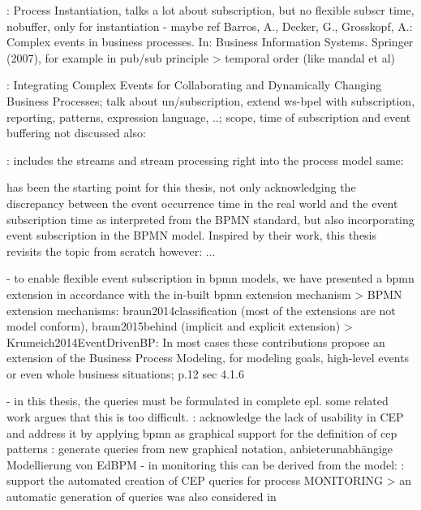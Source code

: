 \cite{decker2008instantiation}: Process Instantiation, talks a lot about subscription, but no flexible subscr time, nobuffer, only for instantiation
- maybe ref Barros, A., Decker, G., Grosskopf, A.: Complex events in business processes. In: Business Information Systems. Springer (2007), for example in pub/sub principle > temporal order (like mandal et al)


\cite{von2010integrating}: Integrating Complex Events for Collaborating and Dynamically Changing Business Processes; talk about un/subscription, extend ws-bpel with subscription, reporting, patterns, expression language, ..; scope, time of subscription and event buffering not discussed
also: \cite{juric2010wsdl}






\cite{appel2014modeling}: includes the streams and stream processing right into the process model
same: \cite{biornstad2006control}


\cite{mandal:2017} has been the starting point for this thesis, not only acknowledging the discrepancy between the event occurrence time in the real world and the event subscription time as interpreted from the BPMN standard, but also incorporating event subscription in the BPMN model.
Inspired by their work, this thesis revisits the topic from scratch
however: ...



- to enable flexible event subscription in bpmn models, we have presented a bpmn extension in accordance with the in-built bpmn extension mechanism
> BPMN extension mechanisms: braun2014classification (most of the extensions are not model conform), braun2015behind (implicit and explicit extension)
> Krumeich2014EventDrivenBP: In most cases these contributions propose an extension of the Business Process Modeling, for modeling goals, high-level events or even whole business situations; p.12 sec 4.1.6





- in this thesis, the queries must be formulated in complete epl. some related work argues that this is too difficult.
\cite{Kunz2010}: acknowledge the lack of usability in CEP and address it by applying bpmn as graphical support for the definition of cep patterns
\cite{gabriel2016konzeptionelle}: generate queries from new graphical notation, anbieterunabhängige Modellierung von EdBPM
- in monitoring this can be derived from the model:
\cite{backmann2013model}: support the automated creation of CEP queries for process MONITORING 
> an automatic generation of queries was also considered in  \cite{Pufahl2017}

